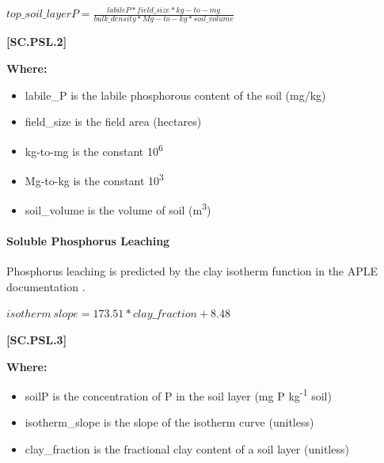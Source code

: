     \begin{center}
\(top\_soil\_layerP=\frac{labileP * field\_size * kg-to-mg}{bulk\_density * Mg-to-kg * soil\_volume}\)

    \end{center}
        \vspace{0.5cm} 
    
            {\raggedleft \textbf{[SC.PSL.2]}\par}
            \vspace{0.5cm}
            \textbf{Where:}

        \begin{itemize}
            \item labile\_P is the labile phosphorous content of the soil (mg/kg)
            \item field\_size is the field area (hectares)
            \item  kg-to-mg is the constant 10\textsuperscript{6}
            \item Mg-to-kg is the constant 10\textsuperscript{3}
            \item soil\_volume is the volume of soil (m\textsuperscript{3})

        \end{itemize}
        \vspace{0.5cm}

\paragraph{Soluble Phosphorus Leaching}
        \vspace{0.5cm}

Phosphorus leaching is predicted by the clay isotherm function in the APLE documentation \parencite{vadas2007}.
        \vspace{0.5cm}
        
    \begin{center}
\(isotherm\ slope=173.51 * clay\_fraction+8.48\)

    \end{center}
        \vspace{0.5cm} 
    
            {\raggedleft \textbf{[SC.PSL.3]}\par}
            \vspace{0.5cm}

        \textbf{Where:}
            
        \begin{itemize}
            \item soilP is the concentration of P in the soil layer (mg P kg\textsuperscript{-1} soil)
            \item isotherm\_slope is the slope of the isotherm curve (unitless)
            \item clay\_fraction is the fractional clay content of a soil layer (unitless)
        \end{itemize}
        \vspace{0.5cm}
        
